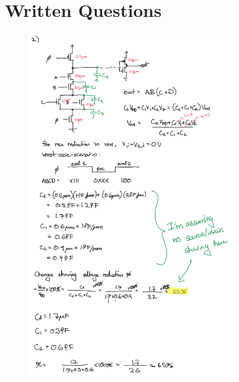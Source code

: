 \documentclass[11pt]{article}
\begin{document}
\section{Written Questions}

\begin{figure}[H]
    \centering
\includegraphics[width=0.8\textwidth]{2a.png}
\end{figure}
\end{document}
